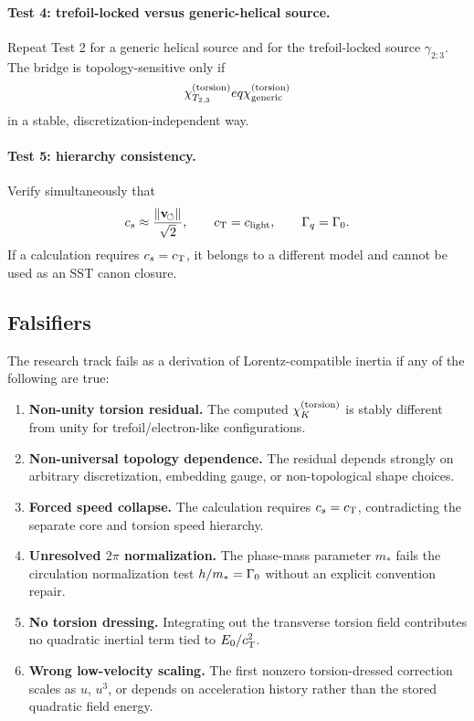\paragraph{Test 4: trefoil-locked versus generic-helical source.}
Repeat Test 2 for a generic helical source and for the trefoil-locked source \(\gamma_{2{:}3}\).  The bridge is topology-sensitive only if
\begin{equation}
    \chi_{T_{2,3}}^{(\torsion)}

eq
    \chi_{\mathrm{generic}}^{(\torsion)}
\end{equation}
in a stable, discretization-independent way.

\paragraph{Test 5: hierarchy consistency.}
Verify simultaneously that
\begin{equation}
    c_s\approx\frac{\lVert\mathbf{v}_{\!\boldsymbol{\circlearrowleft}}\rVert}{\sqrt2},
    \qquad
    c_{\mathrm{T}}=c_{\mathrm{light}},
    \qquad
    \Gamma_q=\Gamma_0.
\end{equation}
If a calculation requires \(c_s=c_{\mathrm{T}}\), it belongs to a different model and cannot be used as an SST canon closure.

\subsection{Falsifiers}
\label{subsec:ctim-falsifiers}

The research track fails as a derivation of Lorentz-compatible inertia if any of the following are true:
\begin{enumerate}
    \item \textbf{Non-unity torsion residual.}  The computed \(\chi_K^{(\mathrm{torsion})}\) is stably different from unity for trefoil/electron-like configurations.
    \item \textbf{Non-universal topology dependence.}  The residual depends strongly on arbitrary discretization, embedding gauge, or non-topological shape choices.
    \item \textbf{Forced speed collapse.}  The calculation requires \(c_s=c_{\mathrm{T}}\), contradicting the separate core and torsion speed hierarchy.
    \item \textbf{Unresolved \(2\pi\) normalization.}  The phase-mass parameter \(m_*\) fails the circulation normalization test \(h/m_* = \Gamma_0\) without an explicit convention repair.
    \item \textbf{No torsion dressing.}  Integrating out the transverse torsion field contributes no quadratic inertial term tied to \(E_0/c_{\mathrm{T}}^2\).
    \item \textbf{Wrong low-velocity scaling.}  The first nonzero torsion-dressed correction scales as \(u\), \(u^3\), or depends on acceleration history rather than the stored quadratic field energy.
\end{enumerate}

